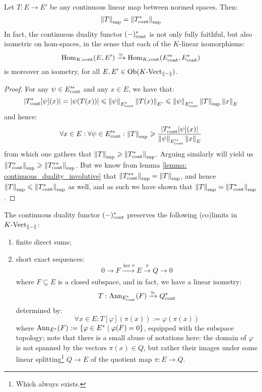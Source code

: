         \begin{proposition} \label{prop: transposition_norms}
            Let $T: E \to E'$ be any continuous linear map between normed spaces. Then:
                $$\left\| {T} \right\|_{\sup} = \left\| {T^*_{\mathrm{cont}}} \right\|_{\sup}$$
            In fact, the continuous duality functor $(-)_{\mathrm{cont}}^*$ is not only fully faithful, but also isometric on hom-spaces, in the sense that each of the $K$-linear isomorphisms:
                $$\mathrm{Hom}_{K, \mathrm{cont}}(E, E') \xrightarrow[]{\simeq} \mathrm{Hom}_{K, \mathrm{cont}}(E'^*_{\mathrm{cont}}, E^*_{\mathrm{cont}})$$
            is moreover an isometry, for all $E, E' \in \mathrm{Ob}( K\text{-}\mathrm{Vect}_{\left\| {-} \right\|} )$.
        \end{proposition}
            \begin{proof}
                For any $\psi \in E'^*_{\mathrm{cont}}$ and any $x \in E$, we have that:
                    $$\left\lvert { T^*_{\mathrm{cont}}[\psi](x) } \right\rvert = \left\lvert {\psi(T(x))} \right\rvert \leqslant \left\| {\psi} \right\|_{E^*_{\mathrm{cont}}} \left\| {T(x)} \right\|_{E'} \leqslant \left\| {\psi} \right\|_{E'^*_{\mathrm{cont}}} \left\| {T} \right\|_{\sup} \left\| {x} \right\|_E$$
                and hence:
                    $$\forall x \in E: \forall \psi \in E'^*_{\mathrm{cont}}: \left\| {T} \right\|_{\sup} \geqslant \frac{ \left\lvert { T^*_{\mathrm{cont}}[\psi](x) } \right\rvert }{\left\| {\psi} \right\|_{E'^*_{\mathrm{cont}}} \left\| {x} \right\|_E }$$
                from which one gathers that $\left\| {T} \right\|_{\sup} \geqslant \left\| {T^*_{\mathrm{cont}}} \right\|_{\sup}$. Arguing similarly will yield us $\left\| {T^*_{\mathrm{cont}}} \right\|_{\sup} \geqslant \left\| {T^{**}_{\mathrm{cont}}} \right\|_{\sup}$. But we know from lemma \ref{lemma: continuous_duality_involutive} that $\left\| {T^{**}_{\mathrm{cont}}} \right\|_{\sup} = \left\| {T} \right\|_{\sup}$, and hence $\left\| {T} \right\|_{\sup} \leqslant \left\| {T^*_{\mathrm{cont}}} \right\|_{\sup}$ as well, and as such we have shown that $\left\| {T} \right\|_{\sup} = \left\| {T^*_{\mathrm{cont}}} \right\|_{\sup}$.
            \end{proof}
        \begin{proposition} \label{prop: properties_of_continuous_duals}
            The continuous duality functor $(-)^*_{\mathrm{cont}}$ preserves the following (co)limits in $K\text{-}\mathrm{Vect}_{\left\| {-} \right\|}$:
            \begin{enumerate}
                \item finite direct sums;
                \item short exact sequences:
                    $$0 \to F \xrightarrow[]{\ker \pi} E \xrightarrow[]{\pi} Q \to 0$$
                where $F \subseteq E$ is a closed subspace, and in fact, we have a linear isometry:
                    $$T: \mathrm{Ann}_{E^*_{\mathrm{cont}}}(F) \xrightarrow[]{\simeq} Q^*_{\mathrm{cont}}$$
                determined by:
                    $$\forall x \in E: T[\varphi]( \pi(x) ) := \varphi(\pi(x))$$
                where $\mathrm{Ann}_{E^*}(F) := \{ \varphi \in E^* \mid \varphi(F) = 0 \}$, equipped with the subspace topology; note that there is a small abuse of notations here: the domain of $\varphi$ is not spanned by the vectors $\pi(x) \in Q$, but rather their images under some linear splitting\footnote{Which always exists.} $Q \to E$ of the quotient map $\pi: E \to Q$.
            \end{enumerate}
        \end{proposition}

